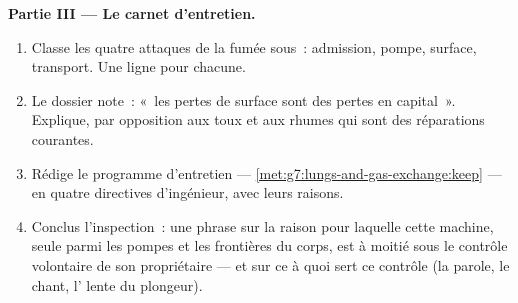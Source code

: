\begin{problem}
\medskip\noindent\textbf{Partie III --- Le carnet
d'entretien.}
\begin{enumerate}[resume]
  \item Classe les quatre attaques de la fumée sous~: admission,
        pompe, surface, transport. Une ligne pour chacune.
  \item Le dossier note~: «~les pertes de surface sont des pertes
        en capital~». Explique, par opposition aux toux et aux
        rhumes qui sont des réparations courantes.
  \item Rédige le programme d'entretien ---
        \cref{met:g7:lungs-and-gas-exchange:keep} --- en quatre
        directives d'ingénieur, avec leurs raisons.
  \item Conclus l'inspection~: une phrase sur la raison pour
        laquelle cette machine, seule parmi les pompes et les
        frontières du corps, est à moitié sous le contrôle
        volontaire de son propriétaire --- et sur ce à quoi sert ce
        contrôle (la parole, le chant, l' lente du
        plongeur).
\end{enumerate}
\end{problem}
